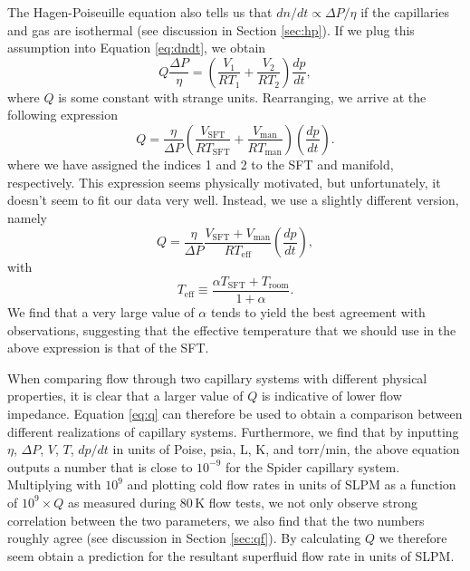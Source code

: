 \documentclass[
12pt, %
letterpaper, %
oneside, %
headinclude, footinclude, %
BCOR5mm, %
]{scrartcl}
\newcommand{\spider}{{\sc Spider} }
\newcommand{\mrm}[1]{\mathrm{#1}}
\begin{document}
The Hagen-Poiseuille equation also tells us that $dn/dt \propto \Delta P /\eta$ if the capillaries and gas are isothermal (see discussion in Section \ref{sec:hp}). If we plug this assumption into Equation \ref{eq:dndt}, we obtain
\begin{equation}
Q \frac{\Delta P}{\eta} = \left(\frac{V_1}{RT_1} + \frac{V_2}{RT_2} \right) \frac{dp}{dt},
\end{equation}
where $Q$ is some constant with strange units. Rearranging, we arrive at the following expression
\begin{equation}
Q = \frac{\eta }{\Delta P} \left( \frac{V_\mrm{SFT}}{RT_\mrm{SFT}}+\frac{V_\mrm{man}}{RT_\mrm{man}} \right) \left( \frac{d p}{d t} \right).
\end{equation}
where we have assigned the indices 1 and 2 to the SFT and manifold, respectively. This expression seems physically motivated, but unfortunately, it doesn't seem to fit our data very well. Instead, we use a slightly different version, namely
\begin{equation}
Q = \frac{\eta }{\Delta P}\frac{V_\mrm{SFT}+V_\mrm{man}}{RT_\mrm{eff}} \left( \frac{d p}{d t} \right),
\label{eq:q}
\end{equation}
with 
\begin{equation}
T_\mrm{eff} \equiv \frac{\alpha T_\mrm{SFT}+T_\mrm{room}}{1+\alpha}.
\end{equation}
We find that a very large value of $\alpha$ tends to yield the best agreement with observations, suggesting that the effective temperature that we should use in the above expression is that of the SFT. 


When comparing flow through two capillary systems with different physical properties, it is clear that a larger value of $Q$ is indicative of lower flow impedance. Equation \ref{eq:q} can therefore be used to obtain a comparison between different realizations of capillary systems. Furthermore, we find that by inputting $\eta$, $\Delta P$, $V$, $T$, $dp/dt$ in units of Poise, psia, L, K, and torr/min, the above equation outputs a number that is close to $10^{-9}$ for the \spider capillary system. Multiplying with $10^9$ and plotting cold flow rates in units of SLPM as a function of $10^{9} \times Q$ as measured during 80\,K flow tests, we not only observe strong correlation between the two parameters, we also find that the two numbers roughly agree (see discussion in Section \ref{sec:qf}). By calculating $Q$ we therefore seem obtain a prediction for the resultant superfluid flow rate in units of SLPM. 
\end{document}
